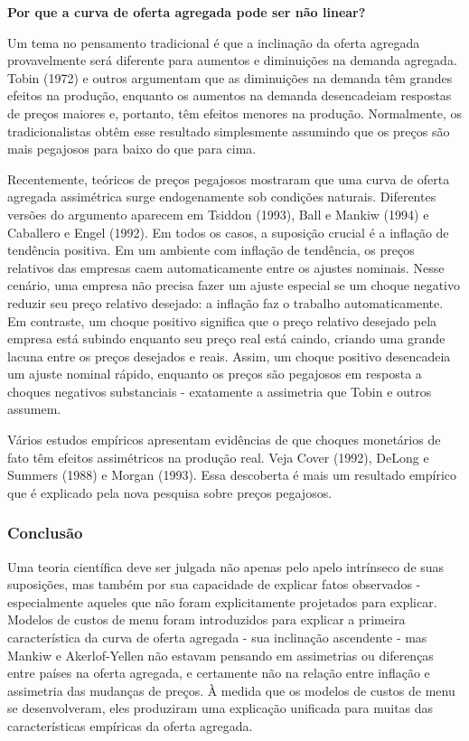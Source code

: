 \documentclass[12pt]{article}
\begin{document}
\textbf{Por que a curva de oferta agregada pode ser não linear?}

Um tema no pensamento tradicional é que a inclinação da oferta agregada provavelmente será diferente para aumentos e diminuições na demanda agregada. Tobin (1972) e outros argumentam que as diminuições na demanda têm grandes efeitos na produção, enquanto os aumentos na demanda desencadeiam respostas de preços maiores e, portanto, têm efeitos menores na produção. Normalmente, os tradicionalistas obtêm esse resultado simplesmente assumindo que os preços são mais pegajosos para baixo do que para cima.

Recentemente, teóricos de preços pegajosos mostraram que uma curva de oferta agregada assimétrica surge endogenamente sob condições naturais. Diferentes versões do argumento aparecem em Tsiddon (1993), Ball e Mankiw (1994) e Caballero e Engel (1992). Em todos os casos, a suposição crucial é a inflação de tendência positiva. Em um ambiente com inflação de tendência, os preços relativos das empresas caem automaticamente entre os ajustes nominais. Nesse cenário, uma empresa não precisa fazer um ajuste especial se um choque negativo reduzir seu preço relativo desejado: a inflação faz o trabalho automaticamente. Em contraste, um choque positivo significa que o preço relativo desejado pela empresa está subindo enquanto seu preço real está caindo, criando uma grande lacuna entre os preços desejados e reais. Assim, um choque positivo desencadeia um ajuste nominal rápido, enquanto os preços são pegajosos em resposta a choques negativos substanciais - exatamente a assimetria que Tobin e outros assumem.

Vários estudos empíricos apresentam evidências de que choques monetários de fato têm efeitos assimétricos na produção real. Veja Cover (1992), DeLong e Summers (1988) e Morgan (1993). Essa descoberta é mais um resultado empírico que é explicado pela nova pesquisa sobre preços pegajosos.

\subsubsection{\textbf{Conclusão}}

Uma teoria científica deve ser julgada não apenas pelo apelo intrínseco de suas suposições, mas também por sua capacidade de explicar fatos observados - especialmente aqueles que não foram explicitamente projetados para explicar. Modelos de custos de menu foram introduzidos para explicar a primeira característica da curva de oferta agregada - sua inclinação ascendente - mas Mankiw e Akerlof-Yellen não estavam pensando em assimetrias ou diferenças entre países na oferta agregada, e certamente não na relação entre inflação e assimetria das mudanças de preços. À medida que os modelos de custos de menu se desenvolveram, eles produziram uma explicação unificada para muitas das características empíricas da oferta agregada.
\end{document}
